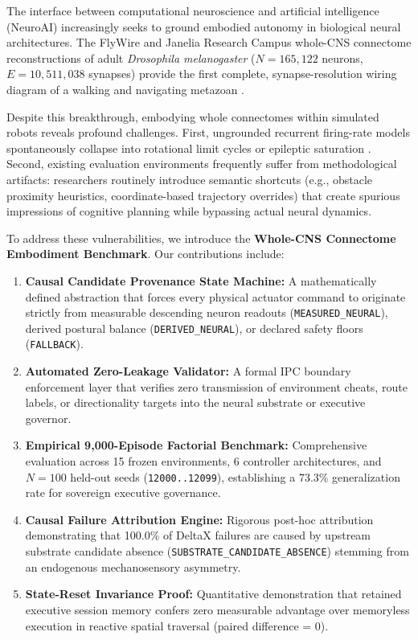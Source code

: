 \documentclass{article}
\begin{document}
The interface between computational neuroscience and artificial intelligence (NeuroAI) increasingly seeks to ground embodied autonomy in biological neural architectures. The FlyWire and Janelia Research Campus whole-CNS connectome reconstructions of adult \textit{Drosophila melanogaster} ($N = 165,122$ neurons, $E = 10,511,038$ synapses) provide the first complete, synapse-resolution wiring diagram of a walking and navigating metazoan \cite{dorkenwald2024neuronal, schlegel2024whole}. 

Despite this breakthrough, embodying whole connectomes within simulated robots reveals profound challenges. First, ungrounded recurrent firing-rate models spontaneously collapse into rotational limit cycles or epileptic saturation \cite{pugliese2025whole}. Second, existing evaluation environments frequently suffer from methodological artifacts: researchers routinely introduce semantic shortcuts (e.g., obstacle proximity heuristics, coordinate-based trajectory overrides) that create spurious impressions of cognitive planning while bypassing actual neural dynamics.

To address these vulnerabilities, we introduce the \textbf{Whole-CNS Connectome Embodiment Benchmark}. Our contributions include:
\begin{enumerate}
    \item \textbf{Causal Candidate Provenance State Machine:} A mathematically defined abstraction that forces every physical actuator command to originate strictly from measurable descending neuron readouts (\texttt{MEASURED\_NEURAL}), derived postural balance (\texttt{DERIVED\_NEURAL}), or declared safety floors (\texttt{FALLBACK}).
    \item \textbf{Automated Zero-Leakage Validator:} A formal IPC boundary enforcement layer that verifies zero transmission of environment cheats, route labels, or directionality targets into the neural substrate or executive governor.
    \item \textbf{Empirical 9,000-Episode Factorial Benchmark:} Comprehensive evaluation across 15 frozen environments, 6 controller architectures, and $N = 100$ held-out seeds (\texttt{12000..12099}), establishing a 73.3\% generalization rate for sovereign executive governance.
    \item \textbf{Causal Failure Attribution Engine:} Rigorous post-hoc attribution demonstrating that 100.0\% of DeltaX failures are caused by upstream substrate candidate absence (\texttt{SUBSTRATE\_CANDIDATE\_ABSENCE}) stemming from an endogenous mechanosensory asymmetry.
    \item \textbf{State-Reset Invariance Proof:} Quantitative demonstration that retained executive session memory confers zero measurable advantage over memoryless execution in reactive spatial traversal (paired difference = 0).
\end{enumerate}
\end{document}
